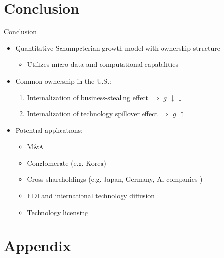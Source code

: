 \documentclass[
  10pt,
  aspectratio=169,   %
]{beamer}
\theoremstyle{plain}
\begin{document}
\section{Conclusion}
\label{conclusion}
\begin{frame}{Conclusion}
  \begin{itemize}
    \item Quantitative Schumpeterian growth model with ownership structure
          \begin{itemize}
            \item Utilizes micro data and computational capabilities
          \end{itemize}
          \medskip{}
    \item Common ownership in the U.S.:
          \begin{enumerate}
            \item Internalization of business-stealing effect $\Longrightarrow$ $g$ $\downarrow\downarrow$
            \item Internalization of technology spillover effect $\Longrightarrow$ $g$ $\uparrow$
          \end{enumerate}
          \medskip{}
    \item Potential applications:
          \begin{itemize}
            \item M\&A
            \item Conglomerate (e.g. Korea)
            \item Cross-shareholdings (e.g. Japan, Germany, AI companies \hyperlink{ai}{})
            \item FDI and international technology diffusion
            \item Technology licensing
          \end{itemize}
  \end{itemize}
\end{frame}

\appendix
\section{Appendix}
\end{document}
